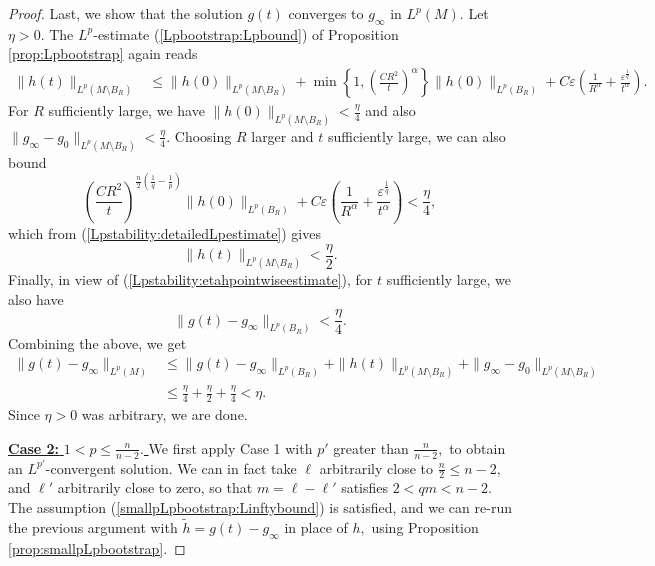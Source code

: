 \documentclass[12pt]{amsart}
\renewcommand{\1}{{\mathbf 1}}
\newcommand{\eps}{{\varepsilon}}
\theoremstyle{others}
\numberwithin{equation}{section}
\begin{document}
\begin{proof}
Last, we show that the solution $g(t)$ converges to $g_\infty$ in $L^p(M).$ Let $\eta > 0.$ The $L^p$-estimate (\ref{Lpbootstrap:Lpbound}) of Proposition \ref{prop:Lpbootstrap} again reads
\begin{equation}\label{Lpstability:detailedLpestimate}
        \begin{split}
        \|h(t) \|_{L^p(M \setminus B_R)} & \leq \|h(0) \|_{L^p ( M \setminus B_R )} + \min \left\{ 1, \left( \frac{C R^2}{t} \right)^{\alpha } \right\} \|h(0)\|_{L^p(B_R)} + C \eps \left( \frac{1}{R^{\alpha} } + \frac{\eps^{\frac{1}{q}}}{t^\alpha} \right).
        \end{split}
    \end{equation}
For $R$ sufficiently large, we have
$\|h(0) \|_{L^p ( M \setminus B_R )} < \frac{\eta}{4}$
and also
 $\|g_\infty - g_0 \|_{L^p(M \setminus B_R)} < \frac{\eta}{4}.$ Choosing $R$ larger and $t$ sufficiently large, we can also bound
 $$\left( \frac{C R^2}{t} \right)^{\frac{n}{2}\left( \frac{1}{q} - \frac{1}{p} \right)}  \|h(0)\|_{L^p(B_R)} + C \eps \left( \frac{1}{R^{\alpha} } + \frac{\eps^{\frac{1}{q}}}{t^\alpha} \right) < \frac{\eta}{4},$$
 which from (\ref{Lpstability:detailedLpestimate}) gives
 $$\|h(t) \|_{L^p(M \setminus B_R)} < \frac{\eta}{2}.$$
Finally, in view of (\ref{Lpstability:etahpointwiseestimate}), for $t$ sufficiently large, we also have
$$\|g(t) - g_\infty \|_{L^p(B_R)} < \frac{\eta}{4}.$$
Combining the above, we get
\begin{equation}
\begin{split}
\|g(t) - g_\infty \|_{L^p(M)} & \leq \|g(t) - g_\infty \|_{L^p(B_R)} + \|h(t) \|_{L^p(M \setminus B_R)} + \|g_\infty - g_0 \|_{L^p(M \setminus B_R)} \\
& \leq \frac{\eta}{4} + \frac{\eta}{2} + \frac{\eta}{4} < \eta.
\end{split}
\end{equation}
Since $\eta > 0$ was arbitrary, we are done.

\vspace{2mm}


\noindent \underline{{\bf Case 2:} $1 < p \leq \frac{n}{n-2}.$ }
We first apply Case 1 with $p'$ greater than $\frac{n}{n-2},$ to obtain an $L^{p'}$-convergent solution. We can in fact take $\ell$ arbitrarily close to $\frac{n}{2} \leq n - 2,$ and $\ell'$ arbitrarily close to zero, so that $m = \ell - \ell'$ satisfies $2 < qm < n-2.$ The assumption (\ref{smallpLpbootstrap:Linftybound}) is satisfied, and we can re-run the previous argument with $\tilde{h} = g(t) - g_\infty$ in place of $h,$ using Proposition \ref{prop:smallpLpbootstrap}.


\end{proof}
\end{document}
